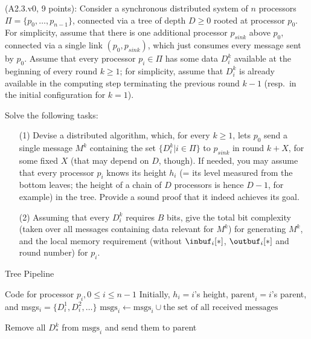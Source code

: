 
\begin{Exc}{(A2.3.v0, 9 points):}
Consider a synchronous distributed system of $n$ processors
$\Pi=\{p_0,\dots,p_{n-1}\}$, connected via a tree of depth $D\geq0$
rooted at processor $p_0$. For simplicity, assume that there is
one additional processor $p_{sink}$ above $p_0$, connected via a single link
$(p_0,p_{sink})$, which just consumes every message sent by $p_0$.
Assume that every processor $p_i\in\Pi$ has
some data $D_i^k$ available at the beginning of every round $k\geq 1$;
for simplicity, assume that $D_i^k$ is already available in the
computing step terminating the previous round $k-1$ (resp.\
in the initial configuration for $k=1$).

Solve the following tasks:
\begin{enumerate}
\item[(1)] Devise a distributed algorithm, which, for every $k\geq 1$,
lets $p_0$ send a single message $M^k$ containing the set
$\{D_i^k| i\in\Pi\}$ to $p_{sink}$ in
round $k+X$, for some fixed $X$ (that may depend on $D$, though).
If needed, you may assume that every processor $p_i$ knows its
height $h_i$ (= its level measured from the bottom leaves;
the height of a chain of $D$ processors is hence $D-1$, for example) in
the tree. Provide a sound proof that it indeed achieves its
goal.

\item[(2)] Assuming that every $D_i^k$ requires $B$ bits,
give the total bit
complexity (taken over all messages containing data relevant for
$M^k$) for generating $M^k$, and the local memory requirement
(without $\inbuf_i[*]$, $\outbuf_i[*]$ and round number) for $p_i$.
\end{enumerate}
\end{Exc}

\begin{algorithm}
\caption{Tree Pipeline} \label{alg:tpipe}
\begin{algorithmic}[1]
\Statex Code for processor $p_i, 0 \leq i \leq n - 1$
\Statex Initially, $h_i = i$'s height, $\text{parent}_i = i$'s parent,
       and msgs$_i = \{ D_i^1, D_i^2, \ldots \}$
    \State $\text{msgs}_i \gets \text{msgs}_i \cup \text{the set of all received messages}$

         \label{line:if}
        \State Remove all $D_*^k$ from $\text{msgs}_i$ and send them to parent \label{line:send}
    \EndIf
\EndFor
\end{algorithmic}
\end{algorithm}

